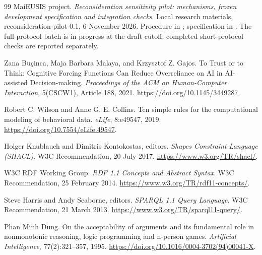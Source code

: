 \documentclass[11pt,a4paper]{article}
\begin{document}
\begin{thebibliography}{99}
MaiEUSIS project. \emph{Reconsideration sensitivity pilot: mechanisms, frozen development specification and integration checks}. Local research materials, reconsideration-pilot-0.1, 6 November 2026. Procedure in ; specification in . The full-protocol batch is in progress at the draft cutoff; completed short-protocol checks are reported separately.

Zana Bu\c{c}inca, Maja Barbara Malaya, and Krzysztof Z. Gajos. To Trust or to Think: Cognitive Forcing Functions Can Reduce Overreliance on AI in AI-assisted Decision-making. \emph{Proceedings of the ACM on Human-Computer Interaction}, 5(CSCW1), Article 188, 2021. \url{https://doi.org/10.1145/3449287}.

Robert C. Wilson and Anne G. E. Collins. Ten simple rules for the computational modeling of behavioral data. \emph{eLife}, 8:e49547, 2019. \url{https://doi.org/10.7554/eLife.49547}.

Holger Knublauch and Dimitris Kontokostas, editors. \emph{Shapes Constraint Language (SHACL)}. W3C Recommendation, 20 July 2017. \url{https://www.w3.org/TR/shacl/}.

W3C RDF Working Group. \emph{RDF 1.1 Concepts and Abstract Syntax}. W3C Recommendation, 25 February 2014. \url{https://www.w3.org/TR/rdf11-concepts/}.

Steve Harris and Andy Seaborne, editors. \emph{SPARQL 1.1 Query Language}. W3C Recommendation, 21 March 2013. \url{https://www.w3.org/TR/sparql11-query/}.

Phan Minh Dung. On the acceptability of arguments and its fundamental role in nonmonotonic reasoning, logic programming and n-person games. \emph{Artificial Intelligence}, 77(2):321--357, 1995. \url{https://doi.org/10.1016/0004-3702(94)00041-X}.
\end{thebibliography}
\endgroup
\end{document}

